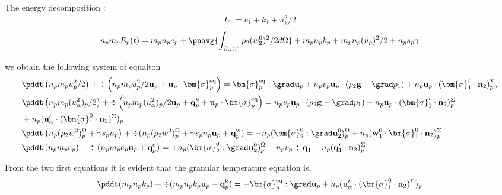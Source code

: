The energy decomposition :
\begin{align*}
    E_1 = e_1 + k_1 + u_k^2/2
\end{align*}
\begin{equation*}
    n_p m_p E_p(t) 
    = m_p n_p e_p 
    + \pnavg{\int_{\Omega_\alpha(t)} \rho_2  (w_2^0)^2/2 d\Omega}
    + m_p n_p k_p
    + m_p n_p (u_p)^2/2
    + n_p s_p \gamma
\end{equation*}


we obtain the following system of equaiton 
\begin{align*}
    &\pddt \left(n_p m_p u_p^2/ 2\right)
    + \div \left(n_p
    m_p u_p^2/ 2 \textbf{u}_p 
    + \textbf{u}_p \cdot \bm{\sigma}_p^\text{eq}
    \right)
    = 
     \bm{\sigma}_p^\text{eq}  :\grad \textbf{u}_p
    +  n_p v_p \textbf{u}_p \cdot 
    (\rho_2 \textbf{g} - \grad p_1)
    + n_p \textbf{u}_p \cdot (\bm{\sigma}_1' \cdot \textbf{n}_2)^\Sigma_p,\\
    &\pddt \left(n_p m_p (u_\alpha^2)_p/ 2\right)
    + \div \left(n_p
    m_p (u_\alpha^2)_p/ 2 \textbf{u}_p 
    + \textbf{q}^k_p
    + \textbf{u}_p \cdot \bm{\sigma}_p^\text{eq}
    \right)
    = 
    n_p v_p \textbf{u}_p \cdot
    (\rho_2 \textbf{g} - \grad p_1)
    + n_p\textbf{u}_p\cdot (\bm{\sigma}_1' \cdot \textbf{n}_2)^\Sigma_p\\
    &+n_p(\textbf{u}_\alpha'\cdot(\bm{\sigma}_1^0 \cdot \textbf{n}_2)^\Sigma)_p
    \\
    &\pddt \left(n_p (\rho_2 w^2 )_p^\Omega+\gamma s_p n_p\right)
    + \div 
    (n_p (\rho_2 w^2 )_p^\Omega+\gamma s_p n_p
    \textbf{u}_p 
    +  \textbf{q}_p^\text{w}
    )
    = 
    - n_p (\bm{\sigma}_2^0 : \grad\textbf{u}_2^0)^\Omega_p
    + n_p (\textbf{w}_1^0 \cdot \bm{\sigma}_1^0 \cdot  \textbf{n}_2)^\Sigma_p\\
    &\pddt \left(n_p m_p e_p\right)
    + \div \left(n_p
    m_p e_p \textbf{u}_p 
    +  \textbf{q}_p^\text{e}
    \right)
    = 
    + n_p (\bm{\sigma}_2^0 : \grad\textbf{u}_2^0)^\Omega_p
    - n_p v_p \div \textbf{q}_1
    - n_p (\textbf{q}_1'\cdot \textbf{n}_2)^\Sigma_p\\
\end{align*}


From the two first equations it is evident that the granular temperature equation is, 
\begin{multline*}
    \pddt(m_p n_pk_p)
    + \div(m_pn_p k_p \textbf{u}_p 
    + \textbf{q}_p^\text{k})
    = 
     - \bm{\sigma}_p^\text{eq}  :\grad \textbf{u}_p
     + n_p (\textbf{u}_\alpha' \cdot (\bm{\sigma}_1^0 \cdot  \textbf{n}_2)^\Sigma)_p
    \\
\end{multline*}


